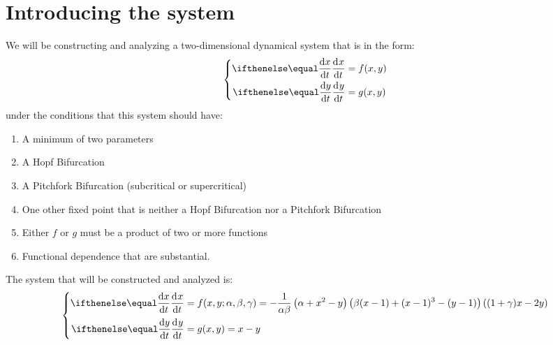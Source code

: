 \section{Introducing the system}\label{sec:introducing-the-system}
We will be constructing and analyzing a two-dimensional dynamical system that is in the form:
\begin{equation*}
    \begin{dcases}
        \begin{aligned}
            \diff[]{x}{t} &= f(x,y)\\
            \diff[]{y}{t} &= g(x,y)
        \end{aligned}
    \end{dcases}
\end{equation*}
under the conditions that this system should have:
\begin{enumerate}
    \item A minimum of two parameters
    \item A Hopf Bifurcation
    \item A Pitchfork Bifurcation (subcritical or supercritical)
    \item One other fixed point that is neither a Hopf Bifurcation nor a Pitchfork Bifurcation
    \item Either $f$ or $g$ must be a product of two or more functions
    \item Functional dependence that are substantial.
\end{enumerate}
The system that will be constructed and analyzed is:
\begin{equation}
    \begin{dcases}
        \begin{aligned}
            \diff[]{x}{t} &= f(x,y;\alpha,\beta,\gamma) = -\frac{1}{\alpha\beta}\left(\alpha+x^2-y\right)\left(\beta(x-1)+(x-1)^3-(y-1)\right)\left((1+\gamma)x-2y\right)\\
            \diff[]{y}{t} &= g(x,y) = x-y
        \end{aligned}
    \end{dcases}
    \label{eq:1}
\end{equation}
